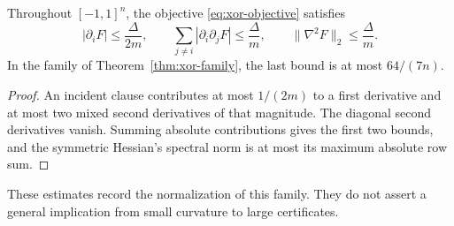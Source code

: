 \begin{proposition}\label{prop:xor-sensitivity}
Throughout $[-1,1]^n$, the objective \eqref{eq:xor-objective} satisfies
\begin{equation}\label{eq:xor-sensitivity}
 |\partial_iF|\le\frac{\Delta}{2m},\qquad
 \sum_{j\ne i}|\partial_i\partial_jF|\le\frac{\Delta}{m},\qquad
 \|\nabla^2F\|_2\le\frac{\Delta}{m}.
\end{equation}
In the family of Theorem~\ref{thm:xor-family}, the last bound is at most
$64/(7n)$.
\end{proposition}
\begin{proof}
An incident clause contributes at most $1/(2m)$ to a first derivative
and at most two mixed second derivatives of that magnitude. The diagonal
second derivatives vanish. Summing absolute contributions gives the first
two bounds, and the symmetric Hessian's spectral norm is at most its
maximum absolute row sum.
\end{proof}
These estimates record the normalization of this family. They do not
assert a general implication from small curvature to large certificates.
